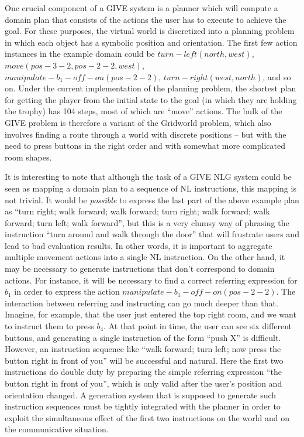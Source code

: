 One crucial component of a GIVE system is a planner which will compute
a domain plan that consists of the actions the user has to execute to
achieve the goal.  For these purposes, the virtual world is
discretized into a planning problem in which each object has a
symbolic position and orientation.  The first few action instances in
the example domain could be $turn-left(north,west)$, $move(pos-3-2,
pos-2-2, west)$, $manipulate-b_1-off-on(pos-2-2)$,
$turn-right(west,north)$,  and so on.  Under the
current implementation of the planning problem, the shortest plan for
getting the player from the initial state to the goal (in which they
are holding the trophy) has 104 steps, most of which are ``move''
actions.  The bulk of the GIVE problem is therefore a variant of the
Gridworld problem, which also involves finding a route through a world
with discrete positions -- but with the need to press buttons in the
right order and with somewhat more complicated room shapes.

It is interesting to note that although the task of a GIVE NLG system
could be seen as mapping a domain plan to a sequence of NL
instructions, this mapping is not trivial.  It would be
\emph{possible} to express the last part of the above example plan as
``turn right; walk forward; walk forward; turn right; walk forward;
walk forward; turn left; walk forward'', but this is a very clumsy way
of phrasing the instruction ``turn around and walk through the door''
that will frustrate users and lead to bad evaluation results.  In
other words, it is important to aggregate multiple movement actions
into a single NL instruction.  On the other hand, it may be necessary
to generate instructions that don't correspond to domain actions.  For
instance, it will be necessary to find a correct referring expression
for $b_1$ in order to express the action
$manipulate-b_1-off-on(pos-2-2)$.  The interaction between referring
and instructing can go much deeper than that.  Imagine, for example,
that the user just entered the top right room, and we want to instruct
them to press $b_4$.  At that point in time, the user can see six
different buttons, and generating a single instruction of the form
``push X'' is difficult.  However, an instruction sequence like ``walk
forward; turn left; now press the button right in front of you'' will
be successful and natural.  Here the first two instructions do double
duty by preparing the simple referring expression ``the button right
in front of you'', which is only valid after the user's position and
orientation changed.  A generation system that is supposed to generate
such instruction sequences must be tightly integrated with the planner
in order to exploit the simultaneous effect of the first two
instructions on the world and on the communicative situation.



